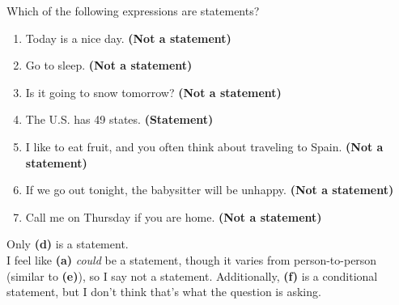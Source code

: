 \documentclass[11pt]{article}
\begin{document}
\makeAssignmentTitle

\begin{homeworkProblem}

Which of the following expressions are statements?

\begin{enumerate}[label=(\alph*), topsep=5pt, itemsep=2pt]
    \item Today is a nice day. \textbf{(Not a statement)}
    \item Go to sleep. \textbf{(Not a statement)}
    \item Is it going to snow tomorrow? \textbf{(Not a statement)}
    \item The U.S. has 49 states. \textbf{(Statement)}
    \item I like to eat fruit, and you often think about traveling to Spain. \textbf{(Not a statement)}
    \item If we go out tonight, the babysitter will be unhappy. \textbf{(Not a statement)}
    \item Call me on Thursday if you are home. \textbf{(Not a statement)}
\end{enumerate} \vspace{1\baselineskip}

\solution

Only \textbf{(d)} is a statement. \\

I feel like \textbf{(a)} \textit{could} be a statement, though it varies from person-to-person (similar to \textbf{(e)}), so I say not a statement. 
Additionally, \textbf{(f)} is a conditional statement, but I don't think that's what the question is asking.

\end{homeworkProblem} 

\pagebreak
\end{document}
